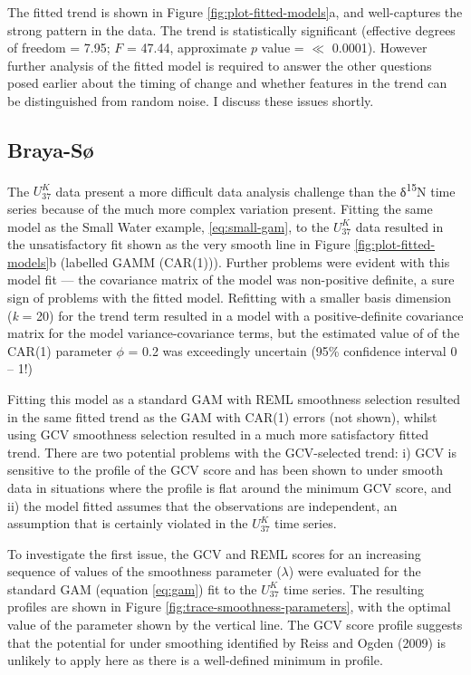 \documentclass[12pt,]{article}
\newcommand{\uk}{\ensuremath{\mathit{U}^{\mathit{K}}_{\mathup{37}}}}
\begin{document}
The fitted trend is shown in Figure \ref{fig:plot-fitted-models}a, and
well-captures the strong pattern in the data. The trend is statistically
significant (effective degrees of freedom = 7.95; \(F\) = 47.44,
approximate \(p\) value = \(\ll\) 0.0001). However further analysis of
the fitted model is required to answer the other questions posed earlier
about the timing of change and whether features in the trend can be
distinguished from random noise. I discuss these issues shortly.

\subsection{Braya-Sø}\label{braya-s}

The \uk{} data present a more difficult data analysis challenge than the
δ\textsuperscript{15}N time series because of the much more complex
variation present. Fitting the same model as the Small Water example,
\eqref{eq:small-gam}, to the \uk{} data resulted in the unsatisfactory
fit shown as the very smooth line in Figure
\ref{fig:plot-fitted-models}b (labelled GAMM (CAR(1))). Further problems
were evident with this model fit --- the covariance matrix of the model
was non-positive definite, a sure sign of problems with the fitted
model. Refitting with a smaller basis dimension (\emph{k} = 20) for the
trend term resulted in a model with a positive-definite covariance
matrix for the model variance-covariance terms, but the estimated value
of of the CAR(1) parameter \(\phi\) = 0.2 was exceedingly uncertain
(95\% confidence interval 0 -- 1!)

Fitting this model as a standard GAM with REML smoothness selection
resulted in the same fitted trend as the GAM with CAR(1) errors (not
shown), whilst using GCV smoothness selection resulted in a much more
satisfactory fitted trend. There are two potential problems with the
GCV-selected trend: i) GCV is sensitive to the profile of the GCV score
and has been shown to under smooth data in situations where the profile
is flat around the minimum GCV score, and ii) the model fitted assumes
that the observations are independent, an assumption that is certainly
violated in the \uk{} time series.

To investigate the first issue, the GCV and REML scores for an
increasing sequence of values of the smoothness parameter (\(\lambda\))
were evaluated for the standard GAM (equation \eqref{eq:gam}) fit to the
\uk{} time series. The resulting profiles are shown in Figure
\ref{fig:trace-smoothness-parameters}, with the optimal value of the
parameter shown by the vertical line. The GCV score profile suggests
that the potential for under smoothing identified by Reiss and Ogden
(2009) is unlikely to apply here as there is a well-defined minimum in
profile.
\end{document}
